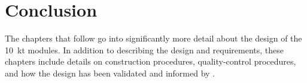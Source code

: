 


\section{Conclusion}
\label{sec:fdsp-exec-conclusion}

The chapters that follow go into significantly more detail about the design of the \SI{10}{\kilo\tonne}   modules. In addition to describing the design and requirements, these chapters include details on construction procedures, quality-control procedures, and how the design has been validated and informed by .

